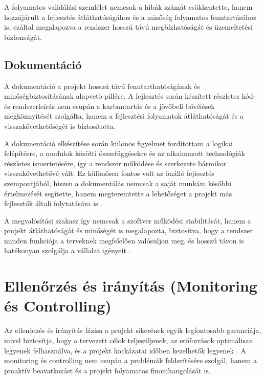A folyamatos validálási szemlélet nemcsak a hibák számát csökkentette, hanem hozzájárult a fejlesztés átláthatóságához és a minőség folyamatos fenntartásához is,  
ezáltal megalapozva a rendszer hosszú távú megbízhatóságát és üzemeltetési biztonságát.

\subsection{Dokumentáció}

A dokumentáció a projekt hosszú távú fenntarthatóságának és minőségbiztosításának alapvető pillére.  
A fejlesztés során készített részletes kód- és rendszerleírás nem csupán a karbantartás és a jövőbeli bővítések megkönnyítését szolgálta,  
hanem a fejlesztési folyamatok átláthatóságát és a visszakövethetőségét is biztosította.  

A dokumentáció elkészítése során különös figyelmet fordítottam a logikai felépítésre, a modulok közötti összefüggésekre és az alkalmazott technológiák 
részletes ismertetésére, így a rendszer működése és szerkezete bármikor visszakövethetővé vált. 
Ez különösen fontos volt az önálló fejlesztés szempontjából, hiszen a dokumentálás nemcsak a saját munkám későbbi értelmezését segítette,  
hanem megteremtette a lehetőséget a projekt más fejlesztők általi folytatására is \cite{Kovacs2016,Kaposi2019,Szalay2018}.  

A megvalósítási szakasz így nemcsak a szoftver működési stabilitását, hanem a projekt átláthatóságát és minőségét is megalapozta,  
biztosítva, hogy a rendszer minden funkciója a terveknek megfelelően valósuljon meg, és hosszú távon is hatékonyan szolgálja a vállalat igényeit \cite{Hajdu2014}.

\section{Ellenőrzés és irányítás (Monitoring és Controlling)}

Az ellenőrzés és irányítás fázisa a projekt sikerének egyik legfontosabb garanciája, mivel biztosítja, 
hogy a tervezett célok teljesüljenek, az erőforrások optimálisan legyenek felhasználva, 
és a projekt kockázatai időben kezelhetők legyenek \cite{Hajdu2014,Szalay2018,Kovacs2016,Kaposi2019}. 
A monitoring és controlling nem csupán a problémák felderítésére szolgál, 
hanem a proaktív beavatkozást és a projekt folyamatos finomhangolását is.

